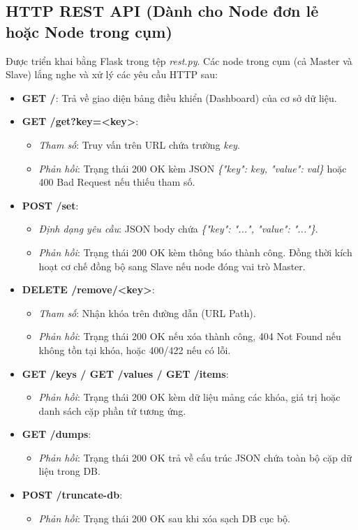 \documentclass[12pt,a4paper]{report}
\begin{document}
\subsection{HTTP REST API (Dành cho Node đơn lẻ hoặc Node trong cụm)}
Được triển khai bằng Flask trong tệp \textit{rest.py}. Các node trong cụm (cả Master và Slave) lắng nghe và xử lý các yêu cầu HTTP sau:
\begin{itemize}
    \item \textbf{GET /}: Trả về giao diện bảng điều khiển (Dashboard) của cơ sở dữ liệu.
    \item \textbf{GET /get?key=<key>}:
        \begin{itemize}
            \item \textit{Tham số}: Truy vấn trên URL chứa trường \textit{key}.
            \item \textit{Phản hồi}: Trạng thái 200 OK kèm JSON \textit{\{"key": key, "value": val\}} hoặc 400 Bad Request nếu thiếu tham số.
        \end{itemize}
    \item \textbf{POST /set}:
        \begin{itemize}
            \item \textit{Định dạng yêu cầu}: JSON body chứa \textit{\{"key": "...", "value": "..."\}}.
            \item \textit{Phản hồi}: Trạng thái 200 OK kèm thông báo thành công. Đồng thời kích hoạt cơ chế đồng bộ sang Slave nếu node đóng vai trò Master.
        \end{itemize}
    \item \textbf{DELETE /remove/<key>}:
        \begin{itemize}
            \item \textit{Tham số}: Nhận khóa trên đường dẫn (URL Path).
            \item \textit{Phản hồi}: Trạng thái 200 OK nếu xóa thành công, 404 Not Found nếu không tồn tại khóa, hoặc 400/422 nếu có lỗi.
        \end{itemize}
    \item \textbf{GET /keys / GET /values / GET /items}:
        \begin{itemize}
            \item \textit{Phản hồi}: Trạng thái 200 OK kèm dữ liệu mảng các khóa, giá trị hoặc danh sách cặp phần tử tương ứng.
        \end{itemize}
    \item \textbf{GET /dumps}:
        \begin{itemize}
            \item \textit{Phản hồi}: Trạng thái 200 OK trả về cấu trúc JSON chứa toàn bộ cặp dữ liệu trong DB.
        \end{itemize}
    \item \textbf{POST /truncate-db}:
        \begin{itemize}
            \item \textit{Phản hồi}: Trạng thái 200 OK sau khi xóa sạch DB cục bộ.
        \end{itemize}
\end{itemize}
\end{document}
